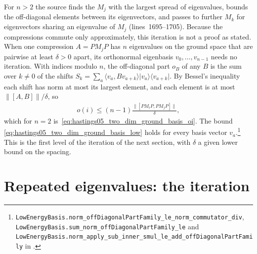 \documentclass{article}
\providecommand{\leanid}[1]{\nolinkurl{#1}}
\begin{document}
For $n>2$ the source finds the $M_j$ with the largest spread of eigenvalues,
bounds the off-diagonal elements between its eigenvectors, and passes to
further $M_k$ for eigenvectors sharing an eigenvalue of $M_j$
(lines~1695--1705). Because the compressions commute only approximately, this
iteration is not a proof as stated. When one compression $A=PM_jP$ has $n$
eigenvalues on the ground space that are pairwise at least $\delta>0$ apart,
its orthonormal eigenbasis $v_0,\dots,v_{n-1}$ needs no iteration. With indices
modulo $n$, the off-diagonal part $o_B$ of any $B$ is the sum over $k\ne0$ of
the shifts
$S_k=\sum_a\langle v_a,Bv_{a+k}\rangle\lvert v_a\rangle\langle v_{a+k}\rvert$.
By Bessel's inequality each shift has norm at most its largest element, and
each element is at most $\lVert[A,B]\rVert/\delta$, so
\begin{align}
  o(i)\le(n-1)\frac{\lVert[PM_iP,PM_jP]\rVert}{\delta},
  \label{eq:hastings05_two_dim_ground_basis_simple}
\end{align}
which for $n=2$ is~\eqref{eq:hastings05_two_dim_ground_basis_oi}. The bound
\eqref{eq:hastings05_two_dim_ground_basis_low} holds for every basis vector
$v_a$.\footnote{\leanid{LowEnergyBasis.norm_offDiagonalPartFamily_le_norm_commutator_div},
    \leanid{LowEnergyBasis.sum_norm_offDiagonalPartFamily_le} and
    \leanid{LowEnergyBasis.norm_apply_sub_inner_smul_le_add_offDiagonalPartFamily}
    in .}
This is the first level of the iteration of the next section, with $\delta$ a
given lower bound on the spacing.

\section{Repeated eigenvalues: the iteration}
\end{document}
